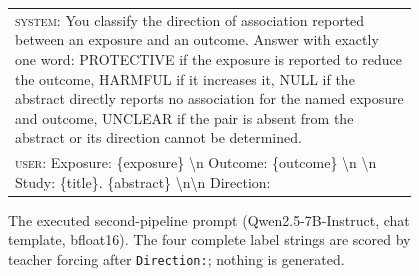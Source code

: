 \documentclass[11pt]{article}
\begin{document}
\begin{figure}[!t]
\small
\begin{tabular}{@{}p{0.95\linewidth}@{}}
\toprule
\textsc{system}: You classify the direction of association reported between an exposure and an
outcome. Answer with exactly one word: PROTECTIVE if the exposure is reported to reduce the outcome,
HARMFUL if it increases it, NULL if the abstract directly reports no association for the named
exposure and outcome, UNCLEAR if the pair is absent from the abstract or its direction cannot be
determined. \\[4pt]
\textsc{user}: Exposure: \{exposure\} \textbackslash n Outcome: \{outcome\} \textbackslash n
\textbackslash n Study: \{title\}. \{abstract\} \textbackslash n\textbackslash n Direction: \\
\bottomrule
\end{tabular}
\caption{The executed second-pipeline prompt (Qwen2.5-7B-Instruct, chat template, bfloat16). The
four complete label strings are scored by teacher forcing after \texttt{Direction:}; nothing is
generated.}
\label{fig:prompt2}
\end{figure}
\end{document}
